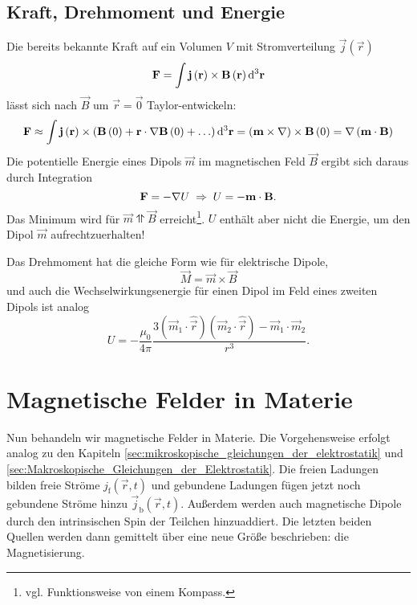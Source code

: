 \subsection{Kraft, Drehmoment und Energie}

Die bereits bekannte Kraft auf ein Volumen $V$ mit Stromverteilung $\vec {j}\left(\vec {r}\right)$
\begin{equation*}
	\vec {F}=\int \vec {j}\left(\vec {r}\right)\times \vec {B}\left(\vec {r}\right)\diffa[3]{\vec{r}}
\end{equation*}
lässt sich nach $\vec {B}$ um $\vec {r}=\vec {0}$ Taylor-entwickeln:
\begin{equation*}
	\vec {F}\approx \int \vec {j}\left(\vec {r}\right)\times \left(\vec {B}\left(0\right)+\vec {r}\cdot \nabla \vec {B}\left(0\right)+\ldots \right)\diffa[3]{\vec{r}}=\left(\vec {m}\times \nabla \right)\times \vec {B}\left(0\right)=\nabla \left(\vec {m}\cdot \vec {B}\right)
\end{equation*}
Die potentielle Energie eines Dipols $\vec {m}$ im magnetischen Feld $\vec {B}$ ergibt sich daraus durch Integration
\begin{equation*}
	\vec F=-\nabla U\implication U=-\vec {m}\cdot \vec {B}.
\end{equation*}
Das Minimum wird für $\vec {m} \upupharpoons \vec {B}$ erreicht\footnote{vgl. Funktionsweise von einem Kompass. }. $U$ enthält aber nicht die Energie, um den Dipol $\vec {m}$ aufrechtzuerhalten!

Das Drehmoment hat die gleiche Form wie für elektrische Dipole,
\begin{equation*}
	\vec {M}=\vec {m}\times \vec {B}
\end{equation*}
und auch die Wechselwirkungsenergie für einen Dipol im Feld eines zweiten Dipols ist analog
\begin{equation*}
	U=-\frac{\mu _{0}}{4\pi }\frac{3\left(\vec {m}_{1}\cdot \hat{\vec {r}}\right)\left(\vec {m}_{2}\cdot \hat{\vec {r}}\right)-\vec {m}_{1}\cdot \vec {m}_{2}}{r^{3}}.
\end{equation*}



\section{Magnetische Felder in Materie}

Nun behandeln wir magnetische Felder in Materie. Die Vorgehensweise erfolgt analog zu den Kapiteln \ref{sec:mikroskopische_gleichungen_der_elektrostatik} und \ref{sec:Makroskopische_Gleichungen_der_Elektrostatik}. Die freien Ladungen bilden freie Ströme $j_{\mathrm{f}}\left(\vec {r},t\right)$ und gebundene Ladungen fügen jetzt noch gebundene Ströme hinzu $\vec {j}_{\mathrm{b}}\left(\vec {r},t\right)$. Außerdem werden auch magnetische Dipole durch den intrinsischen Spin der Teilchen hinzuaddiert. Die letzten beiden Quellen werden dann gemittelt über eine neue Größe beschrieben: die Magnetisierung.

